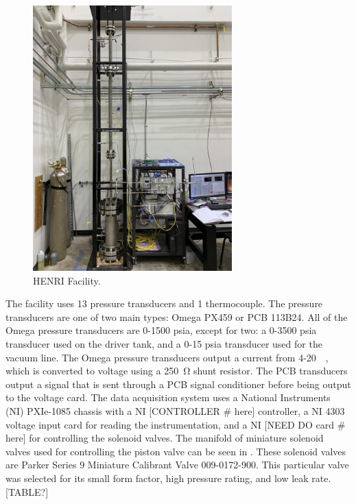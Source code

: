 %
\begin{figure}[htbp]
    \vspace{16pt}
    \centering
    \includegraphics[width=3.024in, height=4.032in]{experiment/photos/Out_of_Pile_Experiment_Setup.jpg}
    \caption{HENRI Facility.}
    \label{fig:HENRI Facility}
    \vspace{16pt}
\end{figure}
%

The facility uses 13 pressure transducers and 1 thermocouple. The pressure transducers are one of two main types: Omega PX459 or PCB 113B24. All of the Omega pressure transducers are 0-1500 psia, except for two: a 0-3500 psia transducer used on the driver tank, and a 0-15 psia transducer used for the vacuum line. The Omega pressure transducers output a current from 4-\SI{20}{\milli\amp}, which is converted to voltage using a \SI{250}{\ohm} shunt resistor. The PCB transducers output a signal that is sent through a PCB signal conditioner before being output to the voltage card. The data acquisition system uses a National Instruments (NI) PXIe-1085 chassis with a NI [CONTROLLER \# here] controller, a NI 4303 voltage input card for reading the instrumentation, and a NI [NEED DO card \# here] for controlling the solenoid valves. The manifold of miniature solenoid valves used for controlling the piston valve can be seen in . These solenoid valves are Parker Series 9 Miniature Calibrant Valve 009-0172-900. This particular valve was selected for its small form factor, high pressure rating, and low leak rate. [TABLE?]



